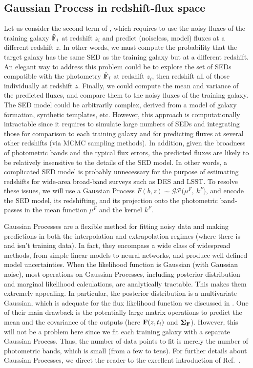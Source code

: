 \documentclass[aps,prd,showpacs,superscriptaddress,groupedaddress]{revtex4}  %
\begin{document}
	
\subsection{Gaussian Process in redshift-flux space}

Let us consider the second term of , which requires to use the noisy fluxes of the training galaxy $\hat{\mat{F}}_i$ at redshift $z_i$ and predict (noiseless, model) fluxes at a different redshift $z$.
In other words, we must compute the probability that the target galaxy has the same SED as the training galaxy but at a different redshift. 
An elegant way to address this problem could be to explore the set of SEDs compatible with the photometry $\hat{\mat{F}}_i$ at redshift $z_i$, then redshift all of those individually at redshift $z$. Finally, we could compute the mean and variance of the predicted fluxes, and compare them to the noisy fluxes of the training galaxy.
The SED model could be arbitrarily complex, \eg derived from a model of galaxy formation, synthetic templates, etc. 
However, this approach is computationally intractable since it requires to simulate large numbers of SEDs and integrating those for comparison to each training galaxy and for predicting fluxes at several other redshifts (\eg via MCMC sampling methods). 
In addition, given the broadness of photometric bands and the typical flux errors, the predicted fluxes are likely to be relatively insensitive to the details of the SED model. 
In other words, a complicated SED model is probably unnecessary for the purpose of estimating redshifts for wide-area broad-band surveys such as DES and LSST.
To resolve these issues, we will use a Gaussian Process $F(b, z) \sim \mathcal{GP}\bigl( \mu^F, \ k^F\bigr)$, and encode the SED model, its redshifting, and its projection onto the photometric band-passes in the mean function $\mu^F$ and the kernel $k^F$. 

Gaussian Processes are a flexible method for fitting noisy data and making predictions in both the interpolation and extrapolation regimes (\ie where there is and isn't training data).
In fact, they encompass a wide class of widespread methods, from simple linear models to neural networks, and produce well-defined model uncertainties.
When the likelihood function is Gaussian (\eg with Gaussian noise), most operations on Gaussian Processes, including posterior distribution and marginal likelihood calculations, are analytically tractable.
This makes them extremely appealing.
In particular, the posterior distribution is a multivariate Gaussian, which is adequate for the flux likelihood function we discussed in . 
One of their main drawback is the potentially large matrix operations to predict the mean and the covariance of the outputs (here $\mat{F}(z, t_i)$ and $\mat{\Sigma_{{\mat{F}}}}$). 
However, this will not be a problem here since we fit each training galaxy with a separate Gaussian Process.
Thus, the number of data points to fit is merely the number of photometric bands, which is small (from a few to tens).
For further details about Gaussian Processes, we direct the reader to the excellent introduction of Ref.~\cite{Rasmussen:2005}.
\end{document}
